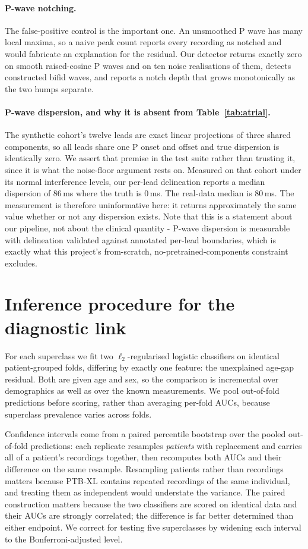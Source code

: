 \documentclass{article}
\begin{document}
\paragraph{P-wave notching.} The false-positive control is the important one. An
unsmoothed P wave has many local maxima, so a naive peak count reports every
recording as notched and would fabricate an explanation for the residual. Our
detector returns exactly zero on smooth raised-cosine P waves and on ten noise
realisations of them, detects constructed bifid waves, and reports a notch depth
that grows monotonically as the two humps separate.

\paragraph{P-wave dispersion, and why it is absent from Table~\ref{tab:atrial}.}
The synthetic cohort's twelve leads are exact linear projections of three shared
components, so all leads share one P onset and offset and true dispersion is
identically zero. We assert that premise in the test suite rather than trusting
it, since it is what the noise-floor argument rests on. Measured on that cohort
under its normal interference levels, our per-lead delineation reports a median
dispersion of 86\,ms where the truth is 0\,ms. The real-data median is 80\,ms.
The measurement is therefore uninformative here: it returns approximately the
same value whether or not any dispersion exists. Note that this is a statement
about our pipeline, not about the clinical quantity - P-wave dispersion is
measurable with delineation validated against annotated per-lead boundaries,
which is exactly what this project's from-scratch, no-pretrained-components
constraint excludes.

\section{Inference procedure for the diagnostic link}
\label{app:inference}

For each superclass we fit two $\ell_2$-regularised logistic classifiers on
identical patient-grouped folds, differing by exactly one feature: the
unexplained age-gap residual. Both are given age and sex, so the comparison is
incremental over demographics as well as over the known measurements. We pool
out-of-fold predictions before scoring, rather than averaging per-fold AUCs,
because superclass prevalence varies across folds.

Confidence intervals come from a paired percentile bootstrap over the pooled
out-of-fold predictions: each replicate resamples \emph{patients} with
replacement and carries all of a patient's recordings together, then recomputes
both AUCs and their difference on the same resample. Resampling patients rather
than recordings matters because PTB-XL contains repeated recordings of the same
individual, and treating them as independent would understate the variance. The
paired construction matters because the two classifiers are scored on identical
data and their AUCs are strongly correlated; the difference is far better
determined than either endpoint. We correct for testing five superclasses by
widening each interval to the Bonferroni-adjusted level.
\end{document}
